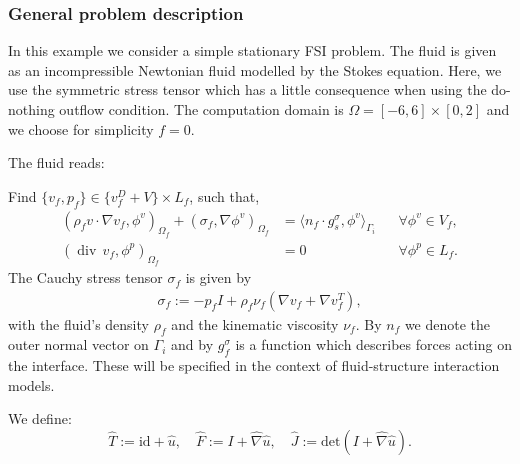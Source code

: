 \subsubsection{General problem description}

In this example we consider a simple stationary FSI problem.   The fluid
is given as an incompressible Newtonian fluid modelled by the Stokes equation. Here, we use the symmetric stress tensor which has a little consequence when using the do-nothing outflow condition.   
The computation domain is $\Omega = [-6,6]\times [0,2]$ and we choose for simplicity $f=0$. 

The fluid reads: 
\begin{Problem}
 Find $\{v_f,p_f\} \in \{ v_f^D + V\} \times L_f$, such that,
  \begin{equation*}
    \begin{aligned} 
      (\rho_f v\cdot\nabla v_f,\phi^v)_{\Omega_f} +
      (\sigma_f,\nabla\phi^v)_{\Omega_f} 
      &= \langle n_f\cdot g_s^\sigma ,\phi^v \rangle_{\Gamma_i}
      &&\forall \phi^v\in V_f, \\
      (\operatorname{div}\, v_f,\phi^p)_{\Omega_f} &= 0
      &&\forall\phi^p\in L_f.
    \end{aligned}
  \end{equation*}
  The Cauchy stress tensor $\sigma_f$ is given by 
  \begin{eqnarray}
    \sigma_f:=-p_f I + \rho_f\nu_f (\nabla v_f+\nabla v_f^T),
  \end{eqnarray}
  with the fluid's density $\rho_f$  and the kinematic viscosity
  $\nu_f$. By $n_f$ we denote the outer normal vector on $\Gamma_i$
  and by $g^\sigma_f$ is a function which describes forces acting on the interface. These
  will be specified in the context of fluid-structure interaction
  models.  
\end{Problem}
We define:
\begin{equation*}
\hat T:=\text{id}+\hat u,\quad
\hat F:=I+\hat\nabla \hat u,\quad
\hat J:=\text{det}(I+\hat\nabla \hat u).
\end{equation*}


